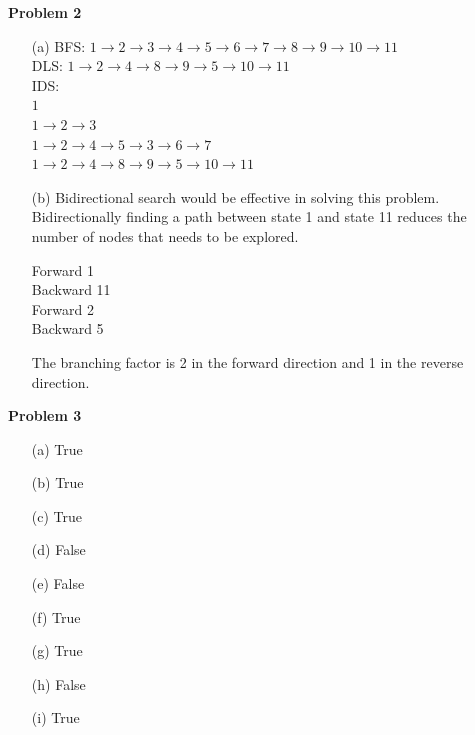 \documentclass[11pt]{article}
\begin{document}
    \begin{center}
        \Large
        \textbf{Problem 2}
    \end{center}
    \normalsize
    \begin{enumerate}
        \item[(a)] %
          BFS: $1 \rightarrow 2 \rightarrow 3\rightarrow 4 \rightarrow 5 \rightarrow 6 \rightarrow 7 \rightarrow 8 \rightarrow9\rightarrow10\rightarrow11$\\
          DLS: $1\rightarrow2\rightarrow4\rightarrow8\rightarrow9\rightarrow5\rightarrow10\rightarrow11$\\
          IDS: \\
          $1$\\
          $1\rightarrow2\rightarrow3$\\
          $1\rightarrow2\rightarrow4\rightarrow5\rightarrow3\rightarrow6\rightarrow7$\\
          $1\rightarrow2\rightarrow4\rightarrow8\rightarrow9\rightarrow5\rightarrow10\rightarrow11$
        
        \item[(b)] %
        Bidirectional search would be effective in solving this problem.
        Bidirectionally finding a path between state 1 and state 11 reduces
        the number of nodes that needs to be explored.
        
        Forward   1\\
        Backward  11\\
        Forward   2\\
        Backward  5
        
        The branching factor is 2 in the forward direction and 1 in the reverse direction.
        
    \end{enumerate}

    \begin{center}
        \Large
        \textbf{Problem 3}
    \end{center}
    \normalsize
    \begin{enumerate}
        \item[(a)] True
        \item[(b)] True
        \item[(c)] True
        \item[(d)] False
        \item[(e)] False
        \item[(f)] True
        \item[(g)] True
        \item[(h)] False
        \item[(i)] True
    \end{enumerate}
\end{document}

